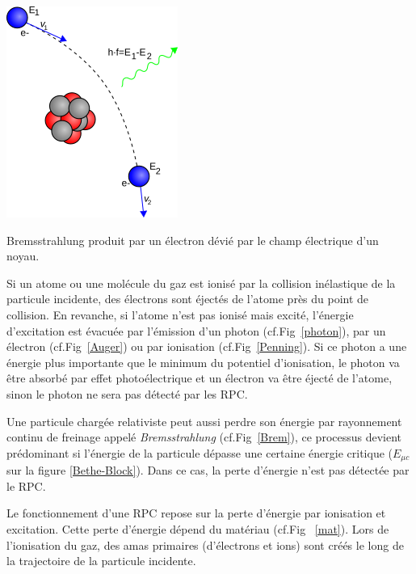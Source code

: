 \marginpar
{
	\centering
	\includegraphics[width=\marginparwidth]{RPC/Brem.png}
	\captionsetup{type=subfigure}\caption{Bremsstrahlung produit par un électron dévié par le champ électrique d'un noyau.}
	\label{Brem}
}

Si un atome ou une molécule du gaz est ionisé par la collision inélastique de la particule incidente, des électrons sont éjectés de l'atome près du point de collision. En revanche, si l'atome n'est pas ionisé mais excité, l'énergie d'excitation est évacuée par l'émission d'un photon (cf.Fig~\ref{photon}), par un électron  (cf.Fig~\ref{Auger}) ou par ionisation  (cf.Fig~\ref{Penning}). Si ce photon a une énergie plus importante que le minimum du potentiel d'ionisation, le photon va être absorbé par effet photoélectrique et un électron va être éjecté de l'atome, sinon le photon ne sera pas détecté par les RPC.

Une particule chargée relativiste peut aussi perdre son énergie par rayonnement continu de freinage appelé \textit{Bremsstrahlung} (cf.Fig~\ref{Brem}), ce processus devient prédominant si l'énergie de la particule dépasse une certaine énergie critique ($E_{\mu c}$ sur la figure \ref{Bethe-Block}). Dans ce cas, la perte d'énergie n'est pas détectée par le RPC.

Le fonctionnement d'une RPC repose sur la perte d'énergie par ionisation et excitation. Cette perte d'énergie dépend du matériau (cf.Fig~ \ref{mat}). Lors de l'ionisation du gaz, des amas primaires (d'électrons et ions) sont créés le long de la trajectoire de la particule incidente. 



